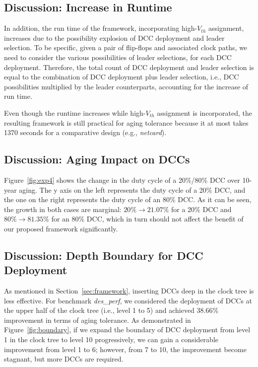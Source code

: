 \subsection{Discussion: Increase in Runtime}
In addition, the run time of the framework, incorporating high-$V_{th}$ assignment, increases due to the possibility explosion of DCC deployment and leader selection. To be specific, given a pair of flip-flops and associated clock paths, we need to consider the various possibilities of leader selections, for each DCC deployment. Therefore, the total  count of DCC deployment and leader selection is equal to the combination of DCC deployment plus leader selection, i.e., DCC possibilities multiplied by the leader counterparts, accounting for the increase of run time. 

Even though the runtime increases while high-$V_{th}$ assignment is incorporated, the resulting framework is still practical for aging tolerance because it at most takes 1370 seconds for a comparative design (e.g., \textit{netcard}).
\subsection{Discussion: Aging Impact on DCCs}


Figure~\ref{fig:exp4} shows the change in the duty cycle of a 20\%/80\% DCC over 10-year aging. The y axis on the left represents the duty cycle of a 20\% DCC, and the one on the right represents the duty cycle of an 80\% DCC. As it can be seen, the growth in both cases are marginal: $20\% \to 21.07\%$ for a 20\% DCC and $80\% \to 81.35\%$ for an 80\% DCC, which in turn should not affect the benefit of our proposed framework significantly.


\subsection{Discussion: Depth Boundary for DCC Deployment}

As mentioned in Section~\ref{sec:framework}, inserting DCCs deep in the clock tree is less effective. For benchmark \textit{des\_perf}, we considered the deployment of DCCs at the upper half of the clock tree (i.e., level 1 to 5) and achieved 38.66\% improvement in terms of aging tolerance. As demonstrated in Figure~\ref{fig:boundary}, if we expand the boundary of DCC deployment from level 1 in the clock tree to level 10 progressively, we can gain a considerable improvement from level 1 to 6; however, from 7 to 10, the improvement become stagnant, but more DCCs are required.


